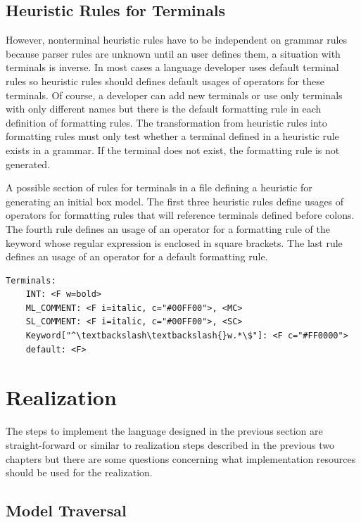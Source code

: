 \documentclass[12pt,notitlepage,a4paper]{report}
\begin{document}
\subsection{Heuristic Rules for Terminals}

However, nonterminal heuristic rules have to be independent on grammar rules because parser rules are unknown until an user defines them, a situation with terminals is inverse. In most cases a language developer uses default terminal rules so heuristic rules should defines default usages of operators for these terminals. Of course, a developer can add new terminals or use only terminals with only different names but there is the default formatting rule in each definition of formatting rules. The transformation from heuristic rules into formatting rules must only test whether a terminal defined in a heuristic rule exists in a grammar. If the terminal does not exist, the formatting rule is not generated.

\begin{expl}\label{HeuristicNonterms}
A possible section of rules for terminals in a file defining a heuristic for generating an initial box model. The first three heuristic rules define usages of operators for formatting rules that will reference terminals defined before colons. The fourth rule defines an usage of an operator for a formatting rule of the keyword whose regular expression is enclosed in square brackets. The last rule defines an usage of an operator for a default formatting rule.
\begingroup
\fontsize{10pt}{12pt}
\begin{Verbatim}[commandchars=\\\{\}]
Terminals: 
    INT: <F w=bold>
    ML_COMMENT: <F i=italic, c="#00FF00">, <MC>
    SL_COMMENT: <F i=italic, c="#00FF00">, <SC>
    Keyword["^\textbackslash\textbackslash{}w.*\$"]: <F c="#FF0000">
    default: <F>
\end{Verbatim}
\endgroup
\end{expl}

\section{Realization}
\label{HeurRealization}
The steps to implement the language designed in the previous section are straight-forward or similar to realization steps described in the previous two chapters but there are some questions concerning what implementation resources should be used for the realization.

\subsection{Model Traversal}
\end{document}
